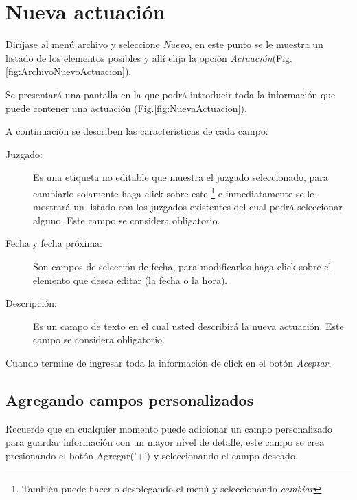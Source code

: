 \section{Nueva actuaci\'on}
\label{sec:nuevaActuacion}
Dir\'ijase al men\'u archivo y seleccione \emph{Nuevo}, en este punto se le muestra un listado de los elementos posibles y
all\'i elija la opci\'on \emph{Actuaci\'on}(Fig.\ref{fig:ArchivoNuevoActuacion}). 
  

Se presentar\'a una pantalla en la que podr\'a introducir toda la informaci\'on
que puede contener una actuaci\'on (Fig.\ref{fig:NuevaActuacion}). 
  

 A continuaci\'on se describen las
caracter\'isticas de cada campo:

\begin{description}
\item[Juzgado:]Es una etiqueta no editable que muestra el juzgado
seleccionado, para cambiarlo solamente haga click sobre este
\footnote{Tambi\'en puede hacerlo desplegando el men\'u \blackberry y
seleccionando \emph{cambiar}}
e inmediatamente se le mostrar\'a un listado con los juzgados existentes del
cual podr\'a seleccionar alguno. Este campo se considera obligatorio.
\item[Fecha y fecha pr\'oxima:]Son campos de selecci\'on de fecha, para
modificarlos haga click sobre el elemento que desea editar (la fecha o la hora).
\item[Descripci\'on:]Es un campo de texto en el cual usted describir\'a la
nueva actuaci\'on. Este campo se considera obligatorio.
\end{description}

Cuando termine de ingresar toda la informaci\'on de click en el bot\'on \emph{Aceptar}.

\subsection{Agregando campos personalizados}
\label{sec:agregarCamposActuacion}
Recuerde que en cualquier momento puede adicionar un campo personalizado para guardar informaci\'on con un mayor nivel de detalle, este campo se crea presionando el bot\'on Agregar('+') y seleccionando el campo deseado.

